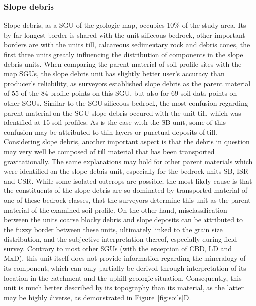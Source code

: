 \documentclass[preprint,12pt,authoryear]{elsarticle}
\begin{document}
\subsubsection{Slope debris}
\label{section:results_SD}
Slope debris, as a SGU of the geologic map, occupies 10\% of the study area. Its by far longest border is shared with the unit siliceous bedrock, other important borders are with the units till, calcareous sedimentary rock and debris cones, the first three units greatly influencing the distribution of components in the slope debris units. When comparing the parent material of soil profile sites with the map SGUs, the slope debris unit has slightly better user's accuracy than producer's reliability, as surveyors established slope debris as the parent material of 55 of the 84 profile points on this SGU, but also for 69 soil data points on other SGUs. Similar to the SGU siliceous bedrock, the most confusion regarding parent material on the SGU slope debris occured with the unit till, which was identified at 15 soil profiles. As is the case with the SB unit, some of this confusion may be attributed to thin layers or punctual deposits of till. Considering slope debris, another important aspect is that the debris in question may very well be composed of till material that has been transported gravitationally. The same explanations may hold for other parent materials which were identified on the slope debris unit, especially for the bedrock units SB, ISR and  CSR. While some isolated outcrops are possible, the most likely cause is that the constituents of the slope debris are so dominated by transported material of one of these bedrock classes, that the surveyors determine this unit as the parent material of the examined soil profile. On the other hand, misclassification between the units coarse blocky debris and slope deposits can be attributed to the fuzzy border between these units, ultimately linked to the grain size distribution, and the subjective interpretation thereof, especially during field survey. 
Contrary to most other SGUs (with the exception of CBD, LD and MxD), this unit itself does not provide information regarding the mineralogy of its component, which can only partially be derived through  interpretation  of its location in the catchment and the uphill geologic situation. Consequently, this unit  is much better described by its topography than its material, as the latter may be highly diverse, as demonstrated in Figure~\ref{fig:soils}D. 
\end{document}
